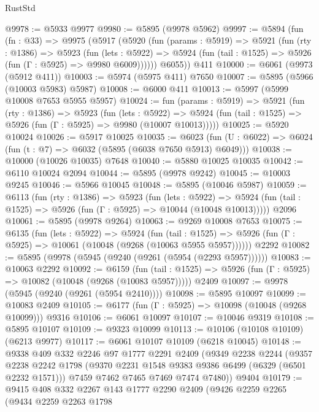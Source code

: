 \begin{lexlean}{RustStd}
\begin{coremodule}
{\begin{coremodule}
{{{{{{{{{{{{{{{{{{{{{{{{{{{{{{{{{{{@9978 := @5933 @9977
@9980 := @5895 (@9978 @5962)
@9997 := @5894
    (fun (fn : @33) =>
    @9975
      (@5917
        (@5920
          (fun (params : @5919) =>
          @5921
            (fun (rty : @1386) =>
            @5923
              (fun (lets : @5922) =>
              @5924 (fun (tail : @1525) => @5926 (fun (Γ : @5925) => @9980 @6009))))))
        @6055))
    @411
@10000 := @6061 (@9973 (@5912 @411))
@10003 := @5974 (@5975 @411) @7650
@10007 := @5895 (@5966 (@10003 @5983) @5987)
@10008 := @6000 @411
@10013 := @5997 (@5999 @10008 @7653 @5955 @5957)
@10024 := fun (params : @5919) =>
  @5921
    (fun (rty : @1386) =>
    @5923
      (fun (lets : @5922) =>
      @5924 (fun (tail : @1525) => @5926 (fun (Γ : @5925) => @9980 (@10007 @10013)))))
@10025 := @5920 @10024
@10026 := @5917 @10025
@10035 := @6023 (fun (U : @6022) => @6024 (fun (t : @7) => @6032 (@5895 (@6038 @7650 @5913) @6049)))
@10038 := @10000 (@10026 @10035) @7648
@10040 := @5880 @10025 @10035
@10042 := @6110 @10024 @2094
@10044 := @5895 (@9978 @9242)
@10045 := @10003 @9245
@10046 := @5966 @10045
@10048 := @5895 (@10046 @5987)
@10059 := @6113
    (fun (rty : @1386) =>
    @5923
      (fun (lets : @5922) =>
      @5924 (fun (tail : @1525) => @5926 (fun (Γ : @5925) => @10044 (@10048 @10013)))))
    @2096
@10061 := @5895 (@9978 @9264)
@10063 := @9269 @10008 @7653
@10075 := @6135
    (fun (lets : @5922) =>
    @5924
      (fun (tail : @1525) =>
      @5926 (fun (Γ : @5925) => @10061 (@10048 (@9268 (@10063 @5955 @5957))))))
    @2292
@10082 := @5895 (@9978 (@5945 (@9240 (@9261 (@5954 (@2293 @5957))))))
@10083 := @10063 @2292
@10092 := @6159
    (fun (tail : @1525) => @5926 (fun (Γ : @5925) => @10082 (@10048 (@9268 (@10083 @5957)))))
    @2409
@10097 := @9978 (@5945 (@9240 (@9261 (@5954 @2410))))
@10098 := @5895 @10097
@10099 := @10083 @2409
@10105 := @6177 (fun (Γ : @5925) => @10098 (@10048 (@9268 @10099))) @9316
@10106 := @6061 @10097
@10107 := @10046 @9319
@10108 := @5895 @10107
@10109 := @9323 @10099
@10113 := @10106 (@10108 @10109) (@6213 @9977)
@10117 := @6061 @10107 @10109 (@6218 @10045)
@10148 := @9338
    @409
    @332
    @2246
    @97
    @1777
    @2291
    @2409
    (@9349
      @2238
      @2244
      (@9357
        @2238
        @2242
        @1798
        (@9370 @2231 @1548 @9383 @9386 @6499 (@6329 (@6501 @2232 @1571)))
        @7459
        @7462
        @7465
        @7469
        @7474
        @7480))
    @9404
@10179 := @9415
    @408
    @332
    @2267
    @143
    @1777
    @2290
    @2409
    (@9426
      @2259
      @2265
      (@9434
        @2259
        @2263
        @1798
}}}}}}}}}}}}}}}}}}}}}}}}}}}}}}}}}}}
\end{coremodule}}
\end{coremodule}
\end{lexlean}
